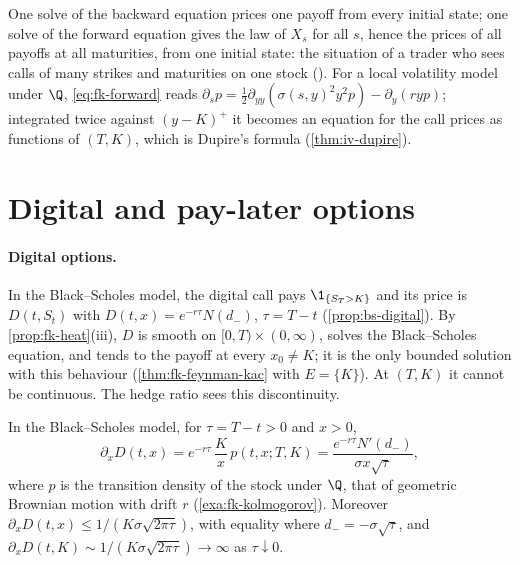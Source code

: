 \begin{remark}\label{rem:fk-two-uses}
One solve of the backward equation prices one payoff from every initial state; one solve of
the forward equation gives the law of $X_s$ for all $s$, hence the prices of all payoffs at all
maturities, from one initial state: the situation of a trader who sees calls of many strikes
and maturities on one stock (). For a local volatility model under $\Q$,
\eqref{eq:fk-forward} reads $\partial_sp=\frac12\partial_{yy}(\sigma(s,y)^2y^2p)-\partial_y(ryp)$;
integrated twice against $(y-K)^+$ it becomes an equation for the call prices as functions of
$(T,K)$, which is Dupire's formula (\cref{thm:iv-dupire}).
\end{remark}


\section{Digital and pay-later options}\label{sec:fk-digital}

\paragraph{Digital options.} In the Black--Scholes model, the digital call pays $\1_{\{S_T>K\}}$ and
its price is $D(t,S_t)$ with $D(t,x)=e^{-r\tau}N(d_-)$, $\tau=T-t$ (\cref{prop:bs-digital}).
By \cref{prop:fk-heat}(iii), $D$ is smooth on $[0,T)\times(0,\infty)$, solves the Black--Scholes
equation, and tends to the payoff at every $x_0\ne K$; it is the only bounded solution with this
behaviour (\cref{thm:fk-feynman-kac} with $E=\{K\}$). At $(T,K)$ it cannot be continuous. The
hedge ratio sees this discontinuity.

\begin{proposition}\label{prop:fk-digital-delta}
In the Black--Scholes model, for $\tau=T-t>0$ and $x>0$,
\[
  \partial_xD(t,x)=e^{-r\tau}\,\frac Kx\,p(t,x;T,K)=\frac{e^{-r\tau}N'(d_-)}{\sigma x\sqrt\tau},
\]
where $p$ is the transition density of the stock under $\Q$, that of geometric Brownian motion
with
drift $r$ (\cref{exa:fk-kolmogorov}). Moreover $\partial_xD(t,x)\le1/(K\sigma\sqrt{2\pi\tau})$, with
equality where $d_-=-\sigma\sqrt\tau$, and $\partial_xD(t,K)\sim1/(K\sigma\sqrt{2\pi\tau})\to\infty$ as
$\tau\downarrow0$.
\end{proposition}

